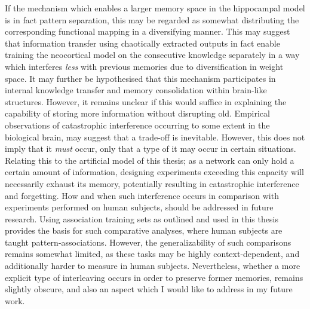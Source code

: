 If the mechanism which enables a larger memory space in the hippocampal model is in fact pattern separation, this may be regarded as somewhat distributing the corresponding functional mapping in a diversifying manner. This may suggest that information transfer using chaotically extracted outputs in fact enable training the neocortical model on the consecutive knowledge separately in a way which interferes \textit{less} with previous memories due to diversification in weight space.
It may further be hypothesised that this mechanism participates in internal knowledge transfer and memory consolidation within brain-like structures. However, it remains unclear if this would suffice in explaining the capability of storing more information without disrupting old. Empirical observations of catastrophic interference occurring to some extent in the biological brain, may suggest that a trade-off is inevitable. However, this does not imply that it \textit{must} occur, only that a type of it may occur in certain situations. Relating this to the artificial model of this thesis; as a network can only hold a certain amount of information, designing experiments exceeding this capacity will necessarily exhaust its memory, potentially resulting in catastrophic interference and forgetting. How and when such interference occurs in comparison with experiments performed on human subjects, should be addressed in future research. Using association training sets as outlined and used in this thesis provides the basis for such comparative analyses, where human subjects are taught pattern-associations. However, the generalizability of such comparisons remains somewhat limited, as these tasks may be highly context-dependent, and additionally harder to measure in human subjects.
Nevertheless, whether a more explicit type of interleaving occurs in order to preserve former memories, remains slightly obscure, and also an aspect which I would like to address in my future work.
\\


